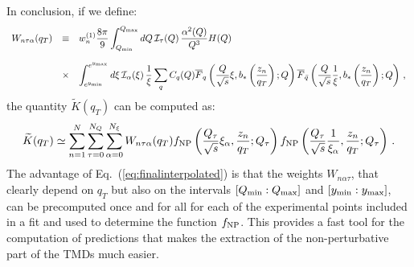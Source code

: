 \documentclass[10pt,a4paper]{article}
\begin{document}
In conclusion, if we define:
\begin{equation}\label{eq:weights}
\begin{array}{rcl}
  \displaystyle  W_{n\tau\alpha}(q_T) & \equiv & \displaystyle w_n^{(1)}\frac{8\pi}{9} \int_{Q_{\rm min}}^{Q_{\rm max}}dQ\,\mathcal{I}_\tau(Q)\, 
                                            \frac{\alpha^2(Q)}{Q^3} H(Q) 
                                            \\
  \\
                                 &\times& \displaystyle 
                                          \int_{e^{y_{\rm
                                          min}}}^{e^{y_{\rm max}}}d\xi\,\mathcal{I}_\alpha(\xi)\,\frac{1}{\xi} \sum_q C_q(Q)\overline{F}_q\left(\frac{Q}{\sqrt{s}}\xi,b_*\left(\frac{z_n}{q_T}\right);Q\right)
                                          \overline{F}_{\bar{q}}\left(\frac{Q}{\sqrt{s}}\frac1{\xi},b_*\left(\frac{z_n}{q_T}\right);Q\right)\,,
\end{array}
\end{equation}
the quantity $\widetilde{K}(q_T)$ can be computed as:
\begin{equation}\label{eq:finalinterpolated}
\widetilde{K}(q_T) \simeq \sum_{n=1}^N
  \sum_{\tau=0}^{N_Q}\sum_{\alpha=0}^{N_\xi} W_{n\tau\alpha}(q_T) f_{\rm NP}\left(\frac{Q_\tau}{\sqrt{s}}\xi_\alpha,\frac{z_n}{q_T};Q_\tau\right) f_{\rm NP}\left(\frac{Q_\tau}{\sqrt{s}}\frac1{\xi_\alpha},\frac{z_n}{q_T};Q_\tau\right)\,.
\end{equation}
The advantage of Eq.~(\ref{eq:finalinterpolated}) is that the weights
$W_{n\alpha\tau}$, that clearly depend on $q_T$ but also on the
intervals $[Q_{\rm min}:Q_{\rm max}]$ and $[y_{\rm min}:y_{\rm max}]$,
can be precomputed once and for all for each of the experimental
points included in a fit and used to determine the function
$f_{\rm NP}$.  This provides a fast tool for the computation of
predictions that makes the extraction of the non-perturbative part of
the TMDs much easier.
\end{document}
